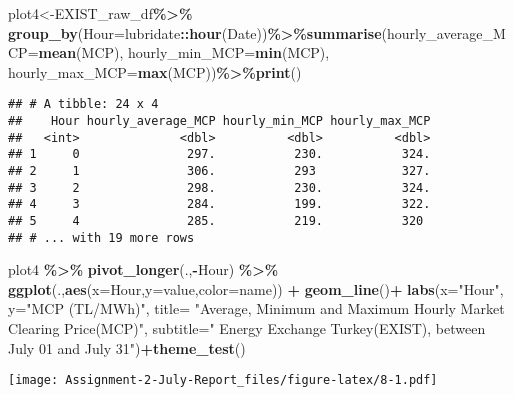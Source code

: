 \documentclass[
]{article}
\newenvironment{Shaded}{\begin{snugshade}}{\end{snugshade}}
\newcommand{\DataTypeTok}[1]{\textcolor[rgb]{0.13,0.29,0.53}{#1}}
\newcommand{\KeywordTok}[1]{\textcolor[rgb]{0.13,0.29,0.53}{\textbf{#1}}}
\newcommand{\NormalTok}[1]{#1}
\newcommand{\OperatorTok}[1]{\textcolor[rgb]{0.81,0.36,0.00}{\textbf{#1}}}
\newcommand{\StringTok}[1]{\textcolor[rgb]{0.31,0.60,0.02}{#1}}
\begin{document}
\begin{Shaded}
\begin{Highlighting}[]
\NormalTok{plot4\textless{}{-}EXIST\_raw\_df}\OperatorTok{\%\textgreater{}\%}\StringTok{ }\KeywordTok{group\_by}\NormalTok{(}\DataTypeTok{Hour=}\NormalTok{lubridate}\OperatorTok{::}\KeywordTok{hour}\NormalTok{(Date))}\OperatorTok{\%\textgreater{}\%}\KeywordTok{summarise}\NormalTok{(}\DataTypeTok{hourly\_average\_MCP=}\KeywordTok{mean}\NormalTok{(MCP), }\DataTypeTok{hourly\_min\_MCP=}\KeywordTok{min}\NormalTok{(MCP), }\DataTypeTok{hourly\_max\_MCP=}\KeywordTok{max}\NormalTok{(MCP))}\OperatorTok{\%\textgreater{}\%}\KeywordTok{print}\NormalTok{()}
\end{Highlighting}
\end{Shaded}

\begin{verbatim}
## # A tibble: 24 x 4
##    Hour hourly_average_MCP hourly_min_MCP hourly_max_MCP
##   <int>              <dbl>          <dbl>          <dbl>
## 1     0               297.           230.           324.
## 2     1               306.           293            327.
## 3     2               298.           230.           324.
## 4     3               284.           199.           322.
## 5     4               285.           219.           320 
## # ... with 19 more rows
\end{verbatim}

\begin{Shaded}
\begin{Highlighting}[]
\NormalTok{plot4 }\OperatorTok{\%\textgreater{}\%}\StringTok{ }\KeywordTok{pivot\_longer}\NormalTok{(.,}\OperatorTok{{-}}\NormalTok{Hour) }\OperatorTok{\%\textgreater{}\%}\StringTok{ }\KeywordTok{ggplot}\NormalTok{(.,}\KeywordTok{aes}\NormalTok{(}\DataTypeTok{x=}\NormalTok{Hour,}\DataTypeTok{y=}\NormalTok{value,}\DataTypeTok{color=}\NormalTok{name)) }\OperatorTok{+}\StringTok{ }\KeywordTok{geom\_line}\NormalTok{()}\OperatorTok{+}
\StringTok{      }\KeywordTok{labs}\NormalTok{(}\DataTypeTok{x=}\StringTok{"Hour"}\NormalTok{, }\DataTypeTok{y=}\StringTok{"MCP (TL/MWh)"}\NormalTok{, }
           \DataTypeTok{title=}  \StringTok{"Average, Minimum and Maximum Hourly Market Clearing Price(MCP)"}\NormalTok{,}
           \DataTypeTok{subtitle=}\StringTok{" Energy Exchange Turkey(EXIST), between July 01 and July 31"}\NormalTok{)}\OperatorTok{+}\KeywordTok{theme\_test}\NormalTok{()}
\end{Highlighting}
\end{Shaded}

\texttt{[image: Assignment-2-July-Report\_files/figure-latex/8-1.pdf]}
\end{document}
